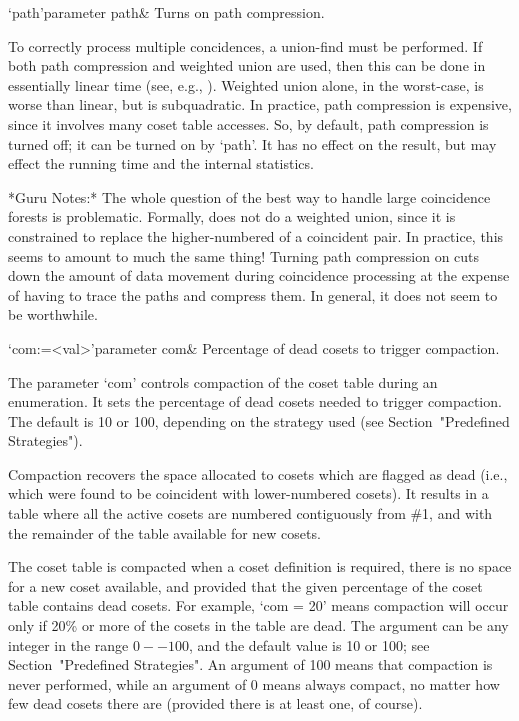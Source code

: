 \>`path'{parameter path}&
Turns on path compression.

To  correctly  process  multiple  concidences, a  union-find  must  be
performed.  If both path compression and weighted union are used, then
this can be  done in essentially linear time  (see, e.g., \cite{CLR}).
Weighted union alone, in the  worst-case, is worse than linear, but is
subquadratic.  In  practice, path  compression is expensive,  since it
involves many coset table  accesses.  So, by default, path compression
is turned off; it can be turned on by `path'.  It has no effect on the
result, but may effect the running time and the internal statistics.

*Guru Notes:*
The whole question of the best way to handle large coincidence forests
is problematic.  Formally, {\ACE} does  not do a weighted union, since
it is constrained to replace the higher-numbered of a coincident pair.
In practice,  this seems  to amount to  much the same  thing!  Turning
path  compression on  cuts down  the  amount of  data movement  during
coincidence processing at the expense of having to trace the paths and
compress them.  In general, it does not seem to be worthwhile.

\>`com:=<val>'{parameter com}&
Percentage of dead cosets to trigger compaction.

The parameter `com'  controls compaction of the coset  table during an
enumeration.  It sets the percentage  of dead cosets needed to trigger
compaction.  The default is 10  or 100, depending on the strategy used
(see Section~"Predefined Strategies").

Compaction recovers the space allocated to cosets which are flagged as
dead  (i.e., which  were found  to be  coincident  with lower-numbered
cosets).   It results  in  a table  where  all the  active cosets  are
numbered contiguously  from \#1, and  with the remainder of  the table
available for new cosets.

The  coset table  is compacted  when a  coset definition  is required,
there is  no space for  a new coset  available, and provided  that the
given  percentage  of  the  coset  table contains  dead  cosets.   For
example, `com =  20' means compaction will occur only  if 20\% or more
of the cosets in the table  are dead.  The argument can be any integer
in  the range  $0--100$,  and the  default  value is  10  or 100;  see
Section~"Predefined  Strategies".   An  argument  of  100  means  that
compaction is  never performed,  while an argument  of 0  means always
compact, no matter how few dead cosets there are (provided there is at
least one, of course).

